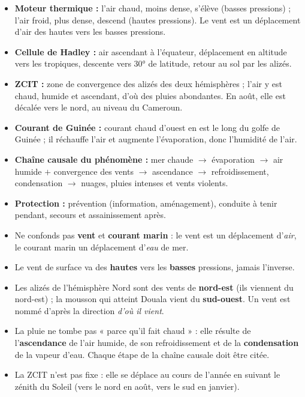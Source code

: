 \documentclass[11pt]{article}
\newcommand{\cle}[1]{{\popxbold\color{popdark}#1}}
\newcounter{popsec}
\newcounter{popsub}
\newcommand{\courssub}[1]{%
  \stepcounter{popsub}%
  \par\vspace{9pt}\noindent{\popxbold\fontsize{11.5}{13}\selectfont\color{popink}{\color{poporange}\thepopsec.\thepopsub}\hspace{6pt}#1}\par\nopagebreak\vspace{4pt}
}
\begin{document}
\courssub{Ressources à mobiliser}

\begin{aretenir}
\begin{itemize}
\item \textbf{Moteur thermique :} l'air chaud, moins dense, s'\cle{élève} (basses pressions) ; l'air froid, plus dense, \cle{descend} (hautes pressions). Le vent est un déplacement d'air des hautes vers les basses pressions.
\item \textbf{Cellule de Hadley :} air ascendant à l'équateur, déplacement en altitude vers les tropiques, descente vers 30° de latitude, retour au sol par les \cle{alizés}.
\item \textbf{ZCIT :} zone de convergence des alizés des deux hémisphères ; l'air y est chaud, humide et ascendant, d'où des pluies abondantes. En août, elle est décalée vers le nord, au niveau du Cameroun.
\item \textbf{Courant de Guinée :} courant chaud d'ouest en est le long du golfe de Guinée ; il réchauffe l'air et augmente l'\cle{évaporation}, donc l'humidité de l'air.
\item \textbf{Chaîne causale du phénomène :} mer chaude $\rightarrow$ évaporation $\rightarrow$ air humide $+$ convergence des vents $\rightarrow$ ascendance $\rightarrow$ refroidissement, condensation $\rightarrow$ nuages, pluies intenses et vents violents.
\item \textbf{Protection :} prévention (information, aménagement), conduite à tenir pendant, secours et assainissement après.
\end{itemize}
\end{aretenir}

\begin{attention}
\begin{itemize}
\item Ne confonds pas \textbf{vent} et \textbf{courant marin} : le vent est un déplacement d'\emph{air}, le courant marin un déplacement d'\emph{eau} de mer.
\item Le vent de surface va des \textbf{hautes} vers les \textbf{basses} pressions, jamais l'inverse.
\item Les alizés de l'hémisphère Nord sont des vents de \textbf{nord-est} (ils viennent du nord-est) ; la mousson qui atteint Douala vient du \textbf{sud-ouest}. Un vent est nommé d'après la direction \emph{d'où il vient}.
\item La pluie ne tombe pas « parce qu'il fait chaud » : elle résulte de l'\textbf{ascendance} de l'air humide, de son refroidissement et de la \textbf{condensation} de la vapeur d'eau. Chaque étape de la chaîne causale doit être citée.
\item La ZCIT n'est pas fixe : elle se déplace au cours de l'année en suivant le zénith du Soleil (vers le nord en août, vers le sud en janvier).
\end{itemize}
\end{attention}
\end{document}
